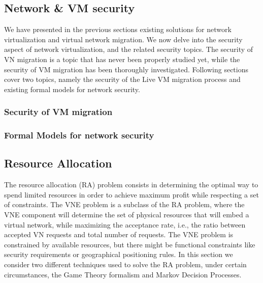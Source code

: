 \documentclass[a4paper, 11pt]{article}
\newcommand{\ie}{i.e.,\xspace}
\begin{document}














\subsection{Network \& VM security}

We have presented in the previous sections existing solutions for network virtualization and virtual network migration. We now delve into the security aspect of network virtualization, and the related security topics. The security of VN migration is a topic that has never been properly studied yet, while the security of VM migration has been thoroughly investigated. Following sections cover two topics, namely the security of the Live VM migration process and existing formal models for network security.

\subsubsection{Security of VM migration}



\subsubsection{Formal Models for network security}



\subsection{Resource Allocation}
The resource allocation (RA) problem consists in determining the optimal way to spend limited resources in order to achieve maximum profit while respecting a set of constraints.
The VNE problem is a subclass of the RA problem, where the VNE component will determine the set of physical resources that will embed a virtual network, while maximizing the acceptance rate, \ie the ratio between accepted VN requests and total number of requests.
The VNE problem is constrained by available resources, but there might be functional constraints like security requirements or geographical positioning rules.
In this section we consider two different techniques used to solve the RA problem, under certain circumstances, the Game Theory formalism and Markov Decision Processes. 
\end{document}
